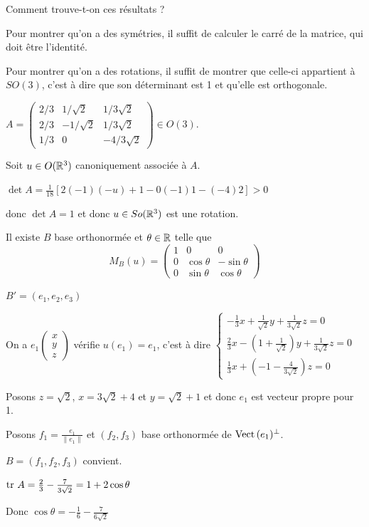 \lvspace 

Comment trouve-t-on ces résultats ? 

Pour montrer qu'on a des symétries, il suffit de calculer le carré de la matrice, qui doit 
être l'identité.

Pour montrer qu'on a des rotations, il suffit de montrer que celle-ci appartient à $SO(3)$, 
c'est à dire que son déterminant est 1 et qu'elle est orthogonale.


\begin{exemple}
    $A = \begin{pmatrix}
        2/3 & 1/\sqrt 2 & 1/3 \sqrt 2 \\
        2 / 3 & - 1 / \sqrt 2 & 1/3 \sqrt 2\\
        1 / 3 & 0 & -4 / 3 \sqrt 2 
    \end{pmatrix} \in O(3)$. 

    Soit $u \in O(\mathbb{R}^3)$ canoniquement associée à $A$. 

    $\det A = \frac 1 {18} \left[ 2(-1)(-u) + 1 - 0(-1)1 - (-4)2\right] > 0$

    donc $\det A = 1$ et donc $u \in So(\mathbb{R}^3)$ est une rotation. 

    Il existe $B$ base orthonormée et $\theta \in \mathbb{R}$ telle que 
    $$M_B(u) = \begin{pmatrix}
        1 & 0 & 0 \\
        0 & \cos \theta & -\sin \theta \\
        0 & \sin \theta & \cos \theta
        \end{pmatrix}$$

    $B' = (e_1, e_2, e_3)$ 

    On a $e_1 \begin{pmatrix}
        x \\ y \\ z
    \end{pmatrix}$ vérifie $u(e_1) = e_1$, c'est à dire 
    $\begin{cases}
        -\frac 1 3x + \frac 1 {\sqrt 2} y + \frac 1 {3 \sqrt 2} z = 0 \\
        \frac 2 3 x -( 1 + \frac 1 {\sqrt 2}) y + \frac 1 {3 \sqrt 2} z = 0 \\
        \frac 1 3x + (- 1 - \frac 4 {3 \sqrt 2}) z = 0
    \end{cases}$

    Posons $z = \sqrt 2$, $x = 3 \sqrt 2 + 4$ et $y = \sqrt 2 +1$ et 
    donc $e_1$ est vecteur propre pour 1. 

    Posons $f_1 = \frac{e_1}{\| e_1 \|}$ et $(f_2, f_3)$ base orthonormée de $\operatorname{Vect} \,(e_1)^\perp$.

    $B = (f_1, f_2, f_3)$ convient. 

    $\operatorname{tr} \, A = \frac 2 3 - \frac 7 {3 \sqrt 2} = 1 + 2 \cos \theta$

    Donc $\cos \theta = - \frac 1 6 - \frac 7 {6 \sqrt 2}$
\end{exemple}

